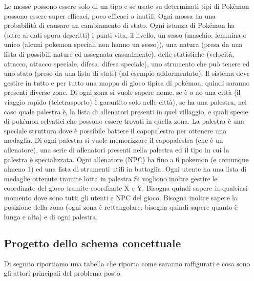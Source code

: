 \documentclass{article}
\begin{document}
Le mosse possono essere solo di un tipo e se usate su determinati tipi di Pokémon possono essere super efficaci, poco efficaci o inutili.
Ogni mossa ha una probabilità di causare un cambiamento di stato.
Ogni istanza di Pokémon ha (oltre ai dati spora descritti) i punti vita, il livello, un sesso (maschio, femmina o unico (alcuni pokemon speciali non hanno un sesso)), una natura (presa da una lista di possibili nature ed assegnata casualmente), delle statistiche (velocità, attacco, attacco speciale, difesa, difesa speciale), uno strumento che può tenere ed uno stato (preso da una lista di stati) (ad esempio addormentato).
Il sistema deve gestire in tutto e per tutto una mappa di gioco tipica di pokémon, quindi saranno presenti diverse zone.
Di ogni zona si vuole sapere nome, se è o no una città (il viaggio rapido (teletrasporto) è garantito solo nelle città), se ha una palestra, nel caso quale palestra è, la lista di allenatori presenti in quel villaggio, e quali specie di pokémon selvatici che possono essere trovati in quella zona.
La palestra è una speciale struttura dove è possibile battere il capopalestra per ottenere una medaglia.
Di ogni palestra si vuole memorizzare il capopalestra (che è un allenatore), una serie di allenatori presenti nella palestra ed il tipo in cui la palestra è specializzata.
Ogni allenatore (NPC) ha fino a 6 pokemon (e comunque almeno 1) ed una lista di strumenti utili in battaglia.
Ogni utente ha una lista di medaglie ottenute tramite lotta in palestra
Si vogliono inoltre gestire le coordinate del gioco tramite coordinate X e Y.
Bisogna quindi sapere in qualsiasi momento dove sono tutti gli utenti e NPC del gioco.
Bisogna inoltre sapere la posizione della zona (ogni zona è rettangolare, bisogna quindi sapere quanto è lunga e alta) e di ogni palestra.

\subsection{Progetto dello schema concettuale}
Di seguito riportiamo una tabella che riporta come saranno raffigurati 
e cosa sono gli attori principali del problema posto.
\end{document}
